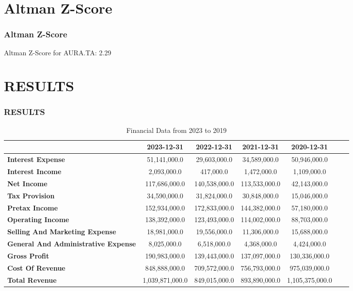 \documentclass{beamer}%
\begin{document}
%
\section{Altman Z{-}Score}%
\label{sec:AltmanZ{-}Score}%
\begin{frame}%
\frametitle{Altman Z-Score}%
Altman Z{-}Score for AURA.TA: 2.29 \newline%
%
\end{frame}

%
\section{RESULTS}%
\label{sec:RESULTS}%
\begin{frame}%
\frametitle{RESULTS}%

    \begin{table}[ht]
    \centering
    \tiny
    \begin{tabular}{lcccccc}
    \toprule
     & \textbf{2023-12-31} & \textbf{2022-12-31} & \textbf{2021-12-31} & \textbf{2020-12-31} \\
    \midrule
    \textbf{Interest Expense} & 51,141,000.0 & 29,603,000.0 & 34,589,000.0 & 50,946,000.0 \\
\textbf{Interest Income} & 2,093,000.0 & 417,000.0 & 1,472,000.0 & 1,109,000.0 \\
\textbf{Net Income} & 117,686,000.0 & 140,538,000.0 & 113,533,000.0 & 42,143,000.0 \\
\textbf{Tax Provision} & 34,590,000.0 & 31,824,000.0 & 30,848,000.0 & 15,046,000.0 \\
\textbf{Pretax Income} & 152,934,000.0 & 172,833,000.0 & 144,382,000.0 & 57,180,000.0 \\
\textbf{Operating Income} & 138,392,000.0 & 123,493,000.0 & 114,002,000.0 & 88,703,000.0 \\
\textbf{Selling And Marketing Expense} & 18,981,000.0 & 19,556,000.0 & 11,306,000.0 & 15,688,000.0 \\
\textbf{General And Administrative Expense} & 8,025,000.0 & 6,518,000.0 & 4,368,000.0 & 4,424,000.0 \\
\textbf{Gross Profit} & 190,983,000.0 & 139,443,000.0 & 137,097,000.0 & 130,336,000.0 \\
\textbf{Cost Of Revenue} & 848,888,000.0 & 709,572,000.0 & 756,793,000.0 & 975,039,000.0 \\
\textbf{Total Revenue} & 1,039,871,000.0 & 849,015,000.0 & 893,890,000.0 & 1,105,375,000.0 \\

    \bottomrule
    \end{tabular}
    \caption{Financial Data from 2023 to 2019}
    \label{tab:financial_data}
    \end{table}
\end{frame}
\end{document}
